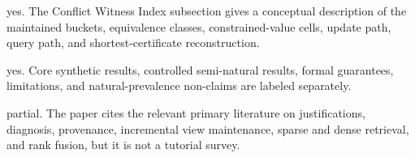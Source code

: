 \documentclass[letterpaper]{article}
\begin{document}
\begin{itemize}

yes. The Conflict Witness Index subsection gives a conceptual description of
the maintained buckets, equivalence classes, constrained-value cells, update
path, query path, and shortest-certificate reconstruction.

yes. Core synthetic results, controlled semi-natural results, formal
guarantees, limitations, and natural-prevalence non-claims are labeled
separately.

partial. The paper cites the relevant primary literature on justifications,
diagnosis, provenance, incremental view maintenance, sparse and dense
retrieval, and rank fusion, but it is not a tutorial survey.

\end{itemize}
\end{document}
